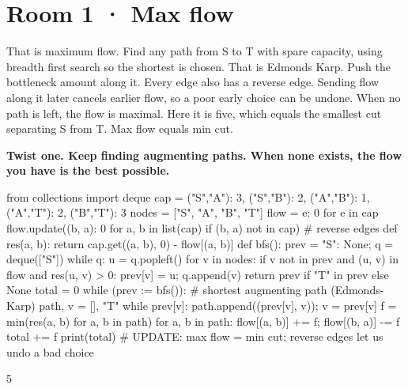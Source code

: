 \documentclass[11pt,a4paper]{report}
\begin{document}
\section*{Room 1 · Max flow}
That is maximum flow. Find any path from S to T with spare capacity, using breadth first search so the shortest is chosen. That is Edmonds Karp. Push the bottleneck amount along it. Every edge also has a reverse edge. Sending flow along it later cancels earlier flow, so a poor early choice can be undone. When no path is left, the flow is maximal. Here it is five, which equals the smallest cut separating S from T. Max flow equals min cut.
\begin{tcolorbox}[colback=yellow!12,colframe=orange!70!black,boxrule=0.4pt,left=4pt,right=4pt,top=2pt,bottom=2pt]\textbf{Twist one. Keep finding augmenting paths. When none exists, the flow you have is the best possible.}\end{tcolorbox}
\begin{Code}
from collections import deque
cap = {("S","A"): 3, ("S","B"): 2, ("A","B"): 1, ("A","T"): 2, ("B","T"): 3}
nodes = ["S", "A", "B", "T"]
flow = {e: 0 for e in cap}
flow.update({(b, a): 0 for a, b in list(cap) if (b, a) not in cap})   # reverse edges
def res(a, b): return cap.get((a, b), 0) - flow[(a, b)]
def bfs():
    prev = {"S": None}; q = deque(["S"])
    while q:
        u = q.popleft()
        for v in nodes:
            if v not in prev and (u, v) in flow and res(u, v) > 0: prev[v] = u; q.append(v)
    return prev if "T" in prev else None
total = 0
while (prev := bfs()):                      # shortest augmenting path (Edmonds-Karp)
    path, v = [], "T"
    while prev[v]: path.append((prev[v], v)); v = prev[v]
    f = min(res(a, b) for a, b in path)
    for a, b in path: flow[(a, b)] += f; flow[(b, a)] -= f
    total += f
print(total)
# UPDATE: max flow = min cut; reverse edges let us undo a bad choice
\end{Code}
\begin{Out}
5
\end{Out}
\end{document}
